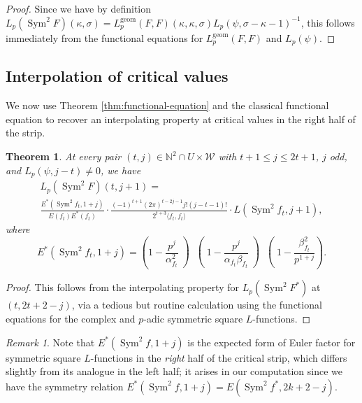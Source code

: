 \documentclass[11pt, a4paper, reqno]{amsart}
\theoremstyle{definition}
\theoremstyle{plain}
\newtheorem{theorem}[definition]{Theorem}
\theoremstyle{remark}
\newtheorem*{remark}{Remark}
\DeclareMathOperator{\Sym}{Sym}
\newcommand{\numberset}{\mathbb}
\newcommand{\N}{\numberset{N}}
\newcommand{\Weight}{\mathcal{W}}
\newcommand{\Lgeom}{L_p^{\mathrm{geom}}}
\renewcommand{\le}{\leqslant}
\begin{document}
  \begin{proof}
   Since we have by definition $L_p(\Sym^2 F)(\kappa, \sigma) = \Lgeom(F,F)(\kappa,\kappa,\sigma) L_p(\psi,\sigma-\kappa-1)^{-1}$, this follows immediately from the functional equations for $\Lgeom(F,F)$ and $L_p(\psi)$.
  \end{proof}
  
 \subsection{Interpolation of critical values}
 
  We now use Theorem \ref{thm:functional-equation} and the classical functional equation to recover an interpolating property at critical values in the right half of the strip.
  
  
  \begin{theorem}
   \label{thm:interpolation-righthalf}
   At every pair $(t,j)\in \N^2 \cap U\times \Weight$ with $t + 1 \le j \le 2t + 1$, $j$ odd, and $L_p(\psi, j - t) \ne 0$, we have
   \begin{multline}
    \label{eq:final-interpolation2}
    L_p(\Sym^2 F)(t,j+1) =\\ \frac{E^*(\Sym^2 f_t, 1 + j)}{E(f_{t})E^*(f_{t})} \cdot \frac{(-1)^{t + 1} (2\pi)^{t-2j - 1} j! (j - t - 1)!}{2^{t+3}\langle f_t, f_t\rangle} \cdot L(\Sym^2 f_{t},j+1),
   \end{multline}
   where 
   \[ E^*(\Sym^2 f_t, 1 + j) = \left(1 - \frac{p^j}{\alpha_{f_t}^2}\middle) \middle(1 - \frac{p^j}{\alpha_{f_t} \beta_{f_t}}\middle)\middle(1 - \frac{\beta_{f_t}^2}{p^{1 + j}}\right).\]
  \end{theorem}
  
  \begin{proof}
   This follows from the interpolating property for $L_p(\Sym^2 F^*)$ at $(t, 2t + 2 - j)$, via a tedious but routine calculation using the functional equations for the complex and $p$-adic symmetric square $L$-functions.
  \end{proof}
  

  \begin{remark}
   Note that $E^*(\Sym^2 f, 1 + j)$ is the expected form of Euler factor for symmetric square $L$-functions in the \emph{right} half of the critical strip, which differs slightly from its analogue in the left half; it arises in our computation since we have the symmetry relation $E^*(\Sym^2 f, 1 + j) = E(\Sym^2 f^*, 2k + 2 - j)$.
  \end{remark}
  
\end{document}
